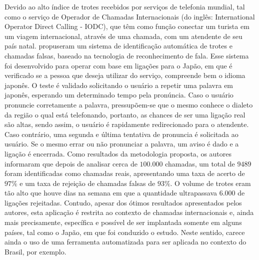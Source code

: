 Devido ao alto índice de trotes recebidos por serviços de telefonia mundial, tal como o serviço de Operador de Chamadas Internacionais (do inglês: International Operator Direct Calling - IODC), que têm como função conectar um turista em um viagem internacional, através de uma chamada, com um atendente de seu país natal. \cite{kuroiwa2004automatic} propuseram um sistema de identificação automática de trotes e chamadas falsas, baseado na tecnologia de reconhecimento de fala. Esse sistema foi desenvolvido para operar com base em ligações para o Japão, em que é verificado se a pessoa que deseja utilizar do serviço, compreende bem o idioma japonês. O teste é validado solicitando o usuário a repetir uma palavra em japonês, esperando um determinado tempo pela pronúncia. Caso o usuário pronuncie corretamente a palavra, pressupõem-se que o mesmo conhece o dialeto da região o qual está telefonando, portanto, as chances de ser uma ligação real são altas, sendo assim, o usuário é rapidamente redirecionado para o atendente. Caso contrário, uma segunda e última tentativa de pronuncia é solicitada ao usuário. Se o mesmo errar ou não pronunciar a palavra, um aviso é dado e a ligação é encerrada. Como resultados da metodologia proposta, os autores informaram que depois de analisar cerca de $100.000$ chamadas, um total de $9489$ foram identificadas como chamadas reais, apresentando uma taxa de acerto de $97\%$ e um taxa de rejeição de chamadas falsas de $93\%$. O volume de trotes eram tão alto que houve dias na semana em que a quantidade ultrapassava $6.000$ de ligações rejeitadas. Contudo, apesar dos ótimos resultados apresentados pelos autores, esta aplicação é restrita ao contexto de chamadas internacionais e, ainda mais precisamente, específica e possível de ser implantada somente em alguns países, tal como o Japão, em que foi conduzido o estudo. Neste sentido, carece ainda o uso de uma ferramenta automatizada para ser aplicada no contexto do Brasil, por exemplo.